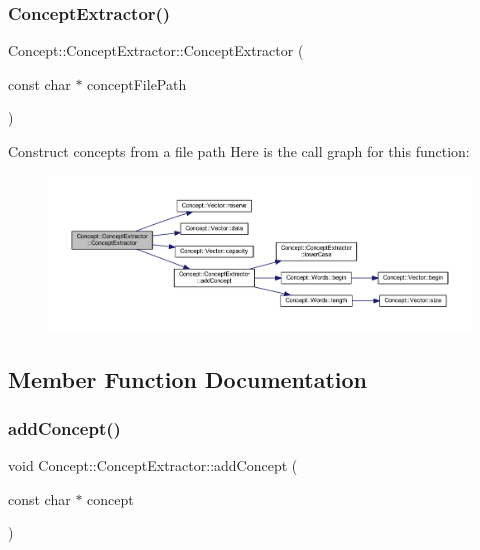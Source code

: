 \subsubsection{\texorpdfstring{ConceptExtractor()}{ConceptExtractor()}\hspace{0.1cm}{\footnotesize\ttfamily [2/2]}}
{\footnotesize\ttfamily Concept\+::\+Concept\+Extractor\+::\+Concept\+Extractor (\begin{DoxyParamCaption}\item[{const char $\ast$}]{concept\+File\+Path }\end{DoxyParamCaption})\hspace{0.3cm}{\ttfamily [inline]}}

Construct concepts from a file path Here is the call graph for this function\+:\nopagebreak
\begin{figure}[H]
\begin{center}
\leavevmode
\includegraphics[width=350pt]{class_concept_1_1_concept_extractor_ad4f2e846cdbeed815dc018bc5235716c_cgraph}
\end{center}
\end{figure}


\subsection{Member Function Documentation}
\mbox{\label{class_concept_1_1_concept_extractor_af42c1de7919fccadf14e33f48af3fb3a}} 
\subsubsection{\texorpdfstring{addConcept()}{addConcept()}}
{\footnotesize\ttfamily void Concept\+::\+Concept\+Extractor\+::add\+Concept (\begin{DoxyParamCaption}\item[{const char $\ast$}]{concept }\end{DoxyParamCaption})\hspace{0.3cm}{\ttfamily [inline]}}

